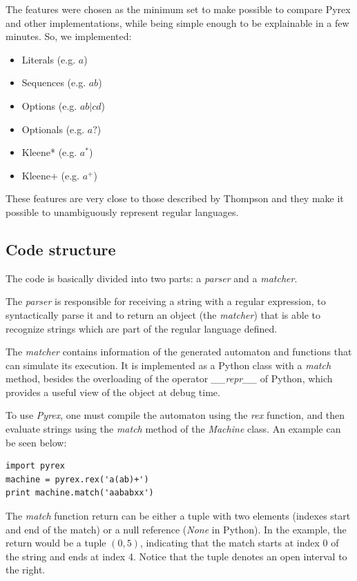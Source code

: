 \documentclass{llncs}
\begin{document}
The features were chosen as the minimum set to make possible to compare Pyrex and other implementations, while being simple enough to be explainable in a few minutes. So, we implemented:

\begin{itemize}
    \item Literals (e.g. $a$)
    \item Sequences (e.g. $ab$)
    \item Options (e.g. $ab|cd$)
    \item Optionals (e.g. $a?$)
    \item Kleene* (e.g. $a^*$)
    \item Kleene+ (e.g. $a^+$)
\end{itemize}

These features are very close to those described by Thompson \cite{bib:Thompson68} and they make it possible to unambiguously represent regular languages.

\subsection{Code structure}

The code is basically divided into two parts: a \emph{parser} and a \emph{matcher}.

The \emph{parser} is responsible for receiving a string with a regular expression, to syntactically parse it and to return an object (the \emph {matcher}) that is able to recognize strings which are part of the regular language defined. 

The \emph {matcher} contains information of the generated automaton and functions that can simulate its execution. It is implemented as a Python class with a \emph{match} method, besides the overloading of the operator \emph{\_\_repr\_\_} of Python, which provides a useful view of the object at debug time. 

To use \emph{Pyrex}, one must compile the automaton using the \emph{rex} function, and then evaluate strings using the \emph{match} method of the \emph {Machine} class. An example can be seen below: 

\begin{verbatim}
import pyrex
machine = pyrex.rex('a(ab)+')
print machine.match('aababxx')
\end{verbatim}

The \emph{match} function return can be either a tuple with two elements (indexes start and end of the match) or a null reference (\emph {None} in Python). In the example, the return would be a tuple $(0,5)$, indicating that the match starts at index 0 of the string and ends at index 4. Notice that the tuple denotes an open interval to the right. 
\end{document}
